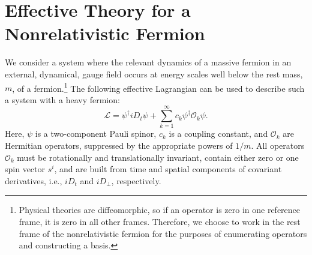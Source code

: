 \documentclass[prd,onecolumn, nofootinbib, 11pt]{revtex4}
\begin{document}
\section{Effective Theory for a Nonrelativistic Fermion}



We consider a system where the relevant dynamics  of a massive fermion in an external, dynamical, gauge field occurs at energy scales well below the rest mass, $m$, of a fermion.\footnote{Physical theories are diffeomorphic, so if an operator is zero in one reference frame, it is zero in all other frames. Therefore, we choose to work in the rest frame of the nonrelativistic fermion for the purposes of enumerating operators and constructing a basis. } The following effective Lagrangian can be used to describe such a system with a heavy fermion:
%
\begin{equation}
\label{lagrangian}
\mathcal{L} = \psi^\dagger iD_t \psi + \displaystyle \sum_{k=1}^\infty   c_k \psi^\dagger \mathcal{O}_k \psi .
\end{equation}
%
Here, $\psi$ is a two-component Pauli spinor, $c_k$ is a coupling constant, and $\mathcal{O}_k$ are Hermitian operators, suppressed by the appropriate powers of $1/m$.  
All operators $\mathcal{O}_k$ must be rotationally and translationally invariant, contain either zero or one spin vector $s^i$, and are built from time and spatial components of covariant derivatives, i.e., $iD_t$ and $iD_\perp$, respectively.  
\end{document}
